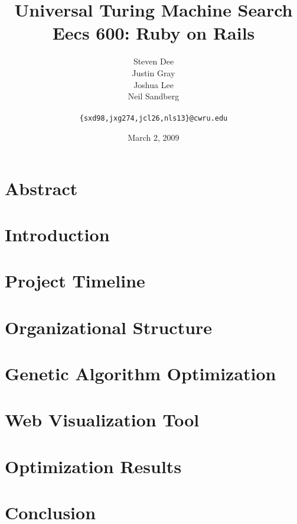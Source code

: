 \documentclass{article}
\title{Universal Turing Machine Search\\
\Large {\sc Eecs} 600: Ruby on Rails}
\author{Steven Dee \\
Justin Gray \\
Joshua Lee \\
Neil Sandberg \\
 \\
\tt \{sxd98,jxg274,jcl26,nls13\}@cwru.edu}
\date{March 2, 2009}
\begin{document}
\maketitle

\section{Abstract}


\section{Introduction}


\section{Project Timeline}


\section{Organizational Structure}


\section{Genetic Algorithm Optimization}


\section{Web Visualization Tool}


\section{Optimization Results}


\section {Conclusion}




\end{document}
